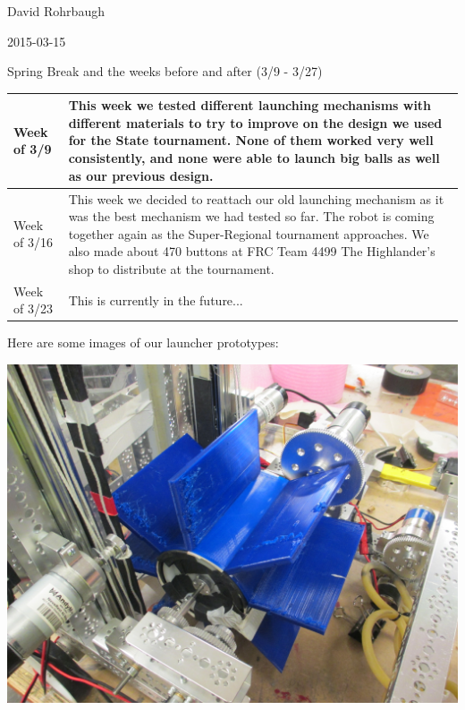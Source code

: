 David Rohrbaugh

2015-03-15

Spring Break and the weeks before and after (3/9 - 3/27)

\begin{tabular}{|p{5cm}|p{5cm}|}
 \hline
 Week of 3/9&
 This week we tested different launching mechanisms with different materials to try to improve on the design we used for the State tournament. None of them worked very well consistently, and none were able to launch big balls as well as our previous design.\\
\hline
 Week of 3/16&
 This week we decided to reattach our old launching mechanism as it was the best mechanism we had tested so far. The robot is coming together again as the Super-Regional tournament approaches. We also made about 470 buttons at FRC Team 4499 The Highlander's shop to distribute at the tournament.\\
\hline
 Week of 3/23&
 This is currently in the future...\\
 \hline
\end{tabular}

\medskip

Here are some images of our launcher prototypes:

\begin{center}
 \includegraphics[width=\textwidth]{./Entries/Images/launchProto7.JPG}
\end{center}

